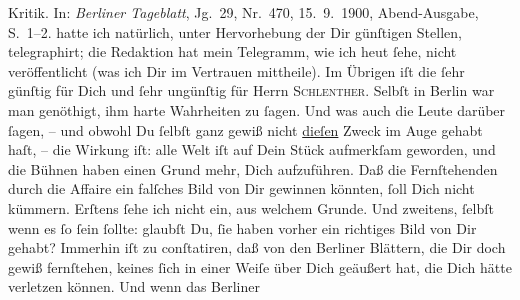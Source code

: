 \begin{ledgroupsized}[t]{13cm}
{{{{                        Kritik}. In: \emph{Berliner Tageblatt},
                     Jg. 29, Nr. 470, 15. 9. 1900, Abend-Ausgabe,
                     S. 1–2.}}}\label{K_L02931-2h} hatte ich natürlich, unter Hervorhebung der Dir günſtigen
               Stellen, telegraphirt; die Redaktion hat mein Telegramm, wie ich heut
               ſehe, nicht veröffentlicht (was ich Dir im Vertrauen mittheile).\pend
           \pstart
           Im Übrigen iſt die \label{K_L02931-3v}\label{K_L02931-3h} ſehr günſtig für Dich und ſehr ungünſtig für Herrn \textsc{Schlenther}. Selbſt in Berlin war man genöthigt, ihm
               harte Wahrheiten zu ſagen. Und was auch die Leute darüber ſagen, – und obwohl Du
               ſelbſt {\pb}ganz gewiß nicht \uline{dieſen} Zweck im Auge gehabt haſt, – die Wirkung iſt:  alle Welt iſt auf Dein Stück aufmerkſam geworden, und die Bühnen
               haben einen Grund mehr, Dich aufzuführen. Daß die Fernſtehenden durch die Affaire ein
               falſches Bild von  Dir gewinnen könnten, ſoll Dich
               nicht kümmern. Erſtens ſehe ich nicht ein, aus welchem Grunde. Und zweitens, ſelbſt
               wenn es ſo ſein ſollte: glaubſt Du, ſie haben vorher ein richtiges Bild von Dir
               gehabt? {\pb}Immerhin iſt zu conſtatiren, daß von den
                  Berliner Blättern, die Dir doch gewiß
               fernſtehen, keines ſich in einer Weiſe über Dich geäußert hat, die Dich hätte
               verletzen können. Und wenn das Berliner

\end{ledgroupsized}
